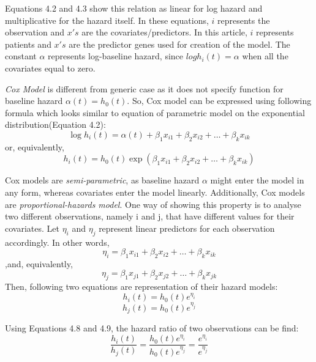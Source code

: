 \documentclass{ba-kecs}
\numberwithin{figure}{section}
\numberwithin{equation}{section}
\begin{document}
Equations 4.2 and 4.3 show this relation as linear for log hazard and multiplicative for the hazard itself. In these equations, $i$ represents the observation and $x's$ are the covariates/predictors. In this article, $i$ represents patients and $x's$ are the predictor genes used for creation of the model. The constant $\alpha$ represents log-baseline hazard, since $log{h_i(t)} = \alpha$ when all the covariates equal to zero. 

\textit{Cox Model} is different from generic case as it does not specify function for baseline hazard $\alpha(t) = h_{0}(t)$. So, Cox model can be expressed using following formula which looks similar to equation of parametric model on the exponential distribution(Equation 4.2):
\begin{equation}
\log{h_{i}(t)} = \alpha(t) + \beta_{1}x_{i1} + \beta_{2}x_{i2} + \hdots + \beta_{k}x_{ik}
\end{equation}
or, equivalently,
\begin{equation}
h_{i}(t) = h_{0}(t)\exp(\beta_{1}x_{i1} + \beta_{2}x_{i2} + \hdots + \beta_{k}x_{ik})
\end{equation}

Cox models are \textit{semi-parametric}, as baseline hazard $\alpha$ might enter the model in any form, whereas covariates enter the model linearly. Additionally, Cox models are \textit{proportional-hazards model}. One way of showing this property is to analyse two different observations, namely i and j, that have different values for their covariates. Let $\eta_{i}$ and $\eta_{j}$ represent linear predictors for each observation accordingly. In other words,
\begin{equation}
\eta_{i} = \beta_{1}x_{i1} + \beta_{2}x_{i2} + \hdots + \beta_{k}x_{ik}
\end{equation}
,and, equivalently,
\begin{equation}
\eta_{j} = \beta_{1}x_{j1} + \beta_{2}x_{j2} + \hdots + \beta_{k}x_{jk}
\end{equation}
Then, following two equations are representation of their hazard models:
\begin{equation}
h_{i}(t) = h_{0}(t)e^{\eta_{i}}
\end{equation}
\begin{equation}
h_{j}(t) = h_{0}(t)e^{\eta_{j}}
\end{equation}

Using Equations 4.8 and 4.9, the hazard ratio of two observations can be find:
\begin{equation}
\dfrac{h_{i}(t)}{h_{j}(t)} = \dfrac{h_{0}(t)e^{\eta_{i}}}{h_{0}(t)e^{\eta_{j}}} = \dfrac{e^{\eta_{i}}}{e^{\eta_{j}}}
\end{equation}
\end{document}
